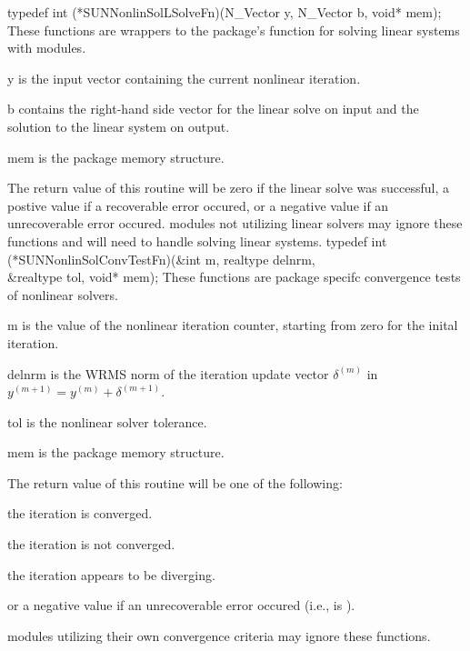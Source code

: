 {
  typedef int (*SUNNonlinSolLSolveFn)(N\_Vector y, N\_Vector b, void* mem);
}
{
  These functions are wrappers to the {\sundials} package's function
  for solving linear systems with {\sunlinsol} modules.
}
{
  \begin{args}[mem]
  \item[y]
    is the input vector containing the current nonlinear iteration.
  \item[b]
    contains the right-hand side vector for the linear solve on input
    and the solution to the linear system on output.
  \item[mem]
    is the {\sundials} package memory structure.
  \end{args}
}
{
  The return value of this routine will be zero if the linear solve
  was successful, a postive value if a recoverable error occured, or a
  negative value if an unrecoverable error occured.
}
{
  {\sunnonlinsol} modules not utilizing {\sunlinsol} linear solvers
  may ignore these functions and will need to handle solving linear
  systems.
}
{
  typedef int (*SUNNonlinSolConvTestFn)(&int m, realtype delnrm,\\
                                        &realtype tol, void* mem);
}
{
  These functions are {\sundials} package specifc convergence tests of
  nonlinear solvers.
}
{
  \begin{args}[delnrm]
  \item[m]
    is the value of the nonlinear iteration counter, starting from
  zero for the inital iteration.
  \item[delnrm]
    is the WRMS norm of the iteration update vector $\delta^{(m)}$ in
    $y^{(m+1)} = y^{(m)} + \delta^{(m+1)}$.
  \item[tol]
    is the nonlinear solver tolerance.
  \item[mem]
    is the {\sundials} package memory structure.
  \end{args}
}
{
  The return value of this routine will be one of the following: 
  \begin{args}
  \item[\id{SUN\_NLS\_SUCCESS}]
    the iteration is converged.
  \item[\id{SUN\_NLS\_CONTINUE}]
    the iteration is not converged.
  \item[\id{SUN\_NLS\_CONV\_RECVR}]
    the iteration appears to be diverging.
  \end{args}
  or a negative value if an unrecoverable error occured
  (i.e.,  is ).
}
{
  {\sunnonlinsol} modules utilizing their own convergence criteria may
  ignore these functions.
}


